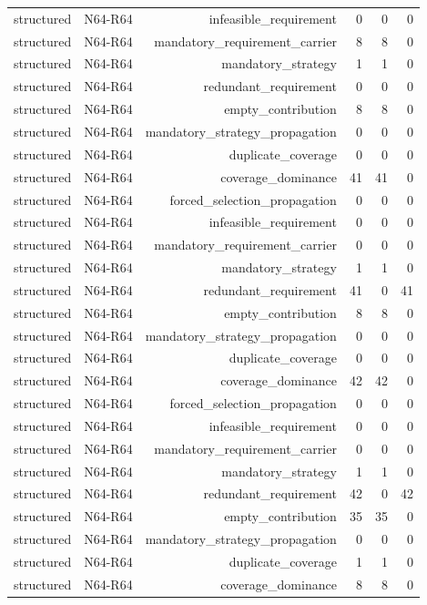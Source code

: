 {\begin{longtable}{lrrrrr}
structured & N64-R64 & infeasible\_requirement & 0 & 0 & 0 \\
structured & N64-R64 & mandatory\_requirement\_carrier & 8 & 8 & 0 \\
structured & N64-R64 & mandatory\_strategy & 1 & 1 & 0 \\
structured & N64-R64 & redundant\_requirement & 0 & 0 & 0 \\
structured & N64-R64 & empty\_contribution & 8 & 8 & 0 \\
structured & N64-R64 & mandatory\_strategy\_propagation & 0 & 0 & 0 \\
structured & N64-R64 & duplicate\_coverage & 0 & 0 & 0 \\
structured & N64-R64 & coverage\_dominance & 41 & 41 & 0 \\
structured & N64-R64 & forced\_selection\_propagation & 0 & 0 & 0 \\
structured & N64-R64 & infeasible\_requirement & 0 & 0 & 0 \\
structured & N64-R64 & mandatory\_requirement\_carrier & 0 & 0 & 0 \\
structured & N64-R64 & mandatory\_strategy & 1 & 1 & 0 \\
structured & N64-R64 & redundant\_requirement & 41 & 0 & 41 \\
structured & N64-R64 & empty\_contribution & 8 & 8 & 0 \\
structured & N64-R64 & mandatory\_strategy\_propagation & 0 & 0 & 0 \\
structured & N64-R64 & duplicate\_coverage & 0 & 0 & 0 \\
structured & N64-R64 & coverage\_dominance & 42 & 42 & 0 \\
structured & N64-R64 & forced\_selection\_propagation & 0 & 0 & 0 \\
structured & N64-R64 & infeasible\_requirement & 0 & 0 & 0 \\
structured & N64-R64 & mandatory\_requirement\_carrier & 0 & 0 & 0 \\
structured & N64-R64 & mandatory\_strategy & 1 & 1 & 0 \\
structured & N64-R64 & redundant\_requirement & 42 & 0 & 42 \\
structured & N64-R64 & empty\_contribution & 35 & 35 & 0 \\
structured & N64-R64 & mandatory\_strategy\_propagation & 0 & 0 & 0 \\
structured & N64-R64 & duplicate\_coverage & 1 & 1 & 0 \\
structured & N64-R64 & coverage\_dominance & 8 & 8 & 0 \\

\end{longtable}}

